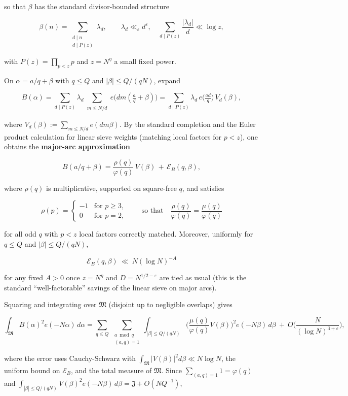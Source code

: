 \documentclass[11pt]{article}
\theoremstyle{definition}
\theoremstyle{remark}
\numberwithin{equation}{part}
\begin{document}
so that $\beta$ has the standard divisor-bounded structure

$$
	\beta(n)=\sum_{\substack{d\mid n\\ d\mid P(z)}}\lambda_d,\qquad
	\lambda_d\ll_\varepsilon d^\varepsilon,\quad \sum_{d\mid P(z)}\frac{|\lambda_d|}{d}\ll \log z,
$$

with $P(z)=\prod_{p<z}p$ and $z=N^{\eta}$ a small fixed power.

On $\alpha=a/q+\beta$ with $q\le Q$ and $|\beta|\le Q/(qN)$, expand

$$
	B(\alpha)=\sum_{d\mid P(z)}\lambda_d
	\sum_{\substack{m\le N/d}} e\!\big(dm(\tfrac aq+\beta)\big)
	=\sum_{d\mid P(z)}\lambda_d\, e\!\big(\tfrac{ad}{q}\big)\,V_d(\beta),
$$

where $V_d(\beta):=\sum_{m\le N/d}e(dm\beta)$. By the standard completion and the Euler product calculation for linear sieve weights (matching local factors for $p<z$), one obtains the \textbf{major-arc approximation}

$$
	B(a/q+\beta)=\frac{\rho(q)}{\varphi(q)}\,V(\beta)\,+\,\mathcal E_B(q,\beta),
$$

where $\rho(q)$ is multiplicative, supported on square-free $q$, and satisfies

$$
	\rho(p)=
	\begin{cases}
		-1 & \text{for } p\ge 3, \\
		0  & \text{for } p=2,
	\end{cases}
	\qquad\text{so that}\quad \frac{\rho(q)}{\varphi(q)}=\frac{\mu(q)}{\varphi(q)}
$$

for all odd $q$ with $p<z$ local factors correctly matched. Moreover, uniformly for $q\le Q$ and $|\beta|\le Q/(qN)$,

$$
	\mathcal E_B(q,\beta)\ \ll\ N(\log N)^{-A}
$$

for any fixed $A>0$ once $z=N^\eta$ and $D=N^{1/2-\varepsilon}$ are tied as usual (this is the standard “well-factorable” savings of the linear sieve on major arcs).

Squaring and integrating over $\mathfrak M$ (disjoint up to negligible overlaps) gives

$$
	\int_{\mathfrak M} B(\alpha)^2 e(-N\alpha)\,d\alpha
	= \sum_{q\le Q}\ \sum_{\substack{a\bmod q\\(a,q)=1}}
	\int_{|\beta|\le Q/(qN)}
	\Big(\frac{\mu(q)}{\varphi(q)}V(\beta)\Big)^{\!2} e(-N\beta)\,d\beta
	\ +\ O\!\Big(\frac{N}{(\log N)^{3+\varepsilon}}\Big),
$$

where the error uses Cauchy-Schwarz with $\int_{\mathfrak M}|V(\beta)|^2 d\beta\ll N\log N$, the uniform bound on $\mathcal E_B$, and the total measure of $\mathfrak M$.
Since $\sum_{(a,q)=1}1=\varphi(q)$ and $\int_{|\beta|\le Q/(qN)}V(\beta)^2 e(-N\beta)\,d\beta=\mathfrak J+O(NQ^{-1})$,
\end{document}
